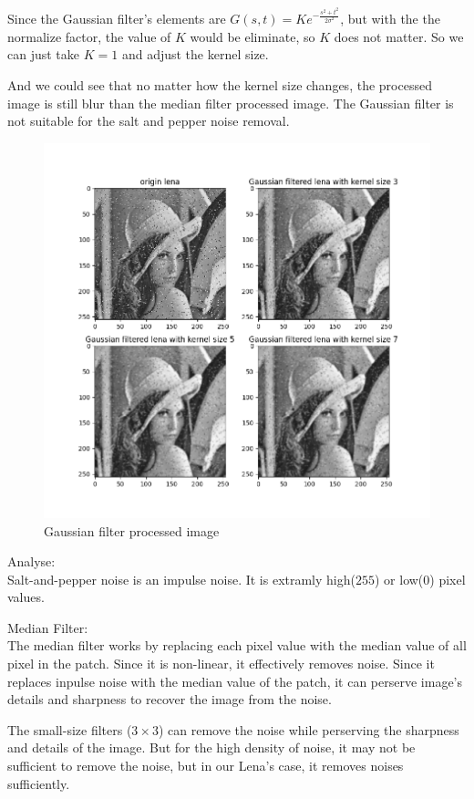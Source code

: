Since the Gaussian filter's elements are $G(s,t)=Ke^{-\frac{s^2+t^2}{2\sigma^2}}$, but with the the normalize factor, the value of
$K$ would be eliminate, so $K$ does not matter. So we can just take $K=1$ and adjust the kernel size.

And we could see that no matter how the kernel size changes, the processed image is still blur than the median filter processed image. The Gaussian filter is not suitable for the salt and pepper noise removal.

\begin{figure}[htbp]
    \centering
	\includegraphics[width=\textwidth]{../images/p3/p3b.png}
    \caption{Gaussian filter processed image}
\label{fig:p3b}
\end{figure}

Analyse:\\
Salt-and-pepper noise is an impulse noise. It is extramly high($255$) or low($0$) pixel values.

Median Filter:\\
The median filter works by replacing each pixel value with the median value of all pixel in the patch. Since it is non-linear, it effectively removes noise. Since it replaces inpulse noise with the median value of the patch, it can perserve image's details and sharpness to recover the image from the noise.

The small-size filters ($3\times 3$) can remove the noise while perserving the sharpness and details of the image. But for the high density of noise, it may not be sufficient to remove the noise, but in our Lena's case, it removes noises sufficiently.

